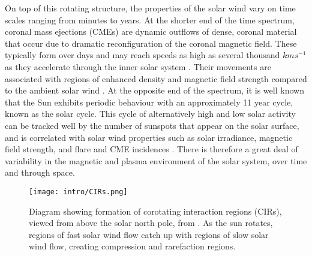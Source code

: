 On top of this rotating structure, the properties of the solar wind vary on time scales ranging from minutes to years. At the shorter end of the time spectrum, coronal mass ejections (CMEs) are dynamic outflows of dense, coronal material that occur due to dramatic reconfiguration of the coronal magnetic field. These typically form over days and may reach speeds as high as several thousand $\si{km s^{-1}}$ as they accelerate through the inner solar system \citep{russell2016}. Their movements are associated with regions of enhanced density and magnetic field strength compared to the ambient solar wind \citep{odstrcil1999}. At the opposite end of the spectrum, it is well known that the Sun exhibits periodic behaviour with an approximately 11 year cycle, known as the solar cycle. This cycle of alternatively high and low solar activity can be tracked well by the number of sunspots that appear on the solar surface, and is correlated with solar wind properties such as solar irradiance, magnetic field strength, and flare and CME incidences \citep{hathaway2015}. There is therefore a great deal of variability in the magnetic and plasma environment of the solar system, over time and through space.

\begin{figure}
\centering
\noindent\texttt{[image: intro/CIRs.png]}
\caption[Diagram showing formation of corotating interaction regions (CIRs).]{Diagram showing formation of corotating interaction regions (CIRs), viewed from above the solar north pole, from \citet{pizzo1978}. As the sun rotates, regions of fast solar wind flow catch up with regions of slow solar wind flow, creating compression and rarefaction regions.}
\label{intro:fig:CIRs}
\end{figure}

